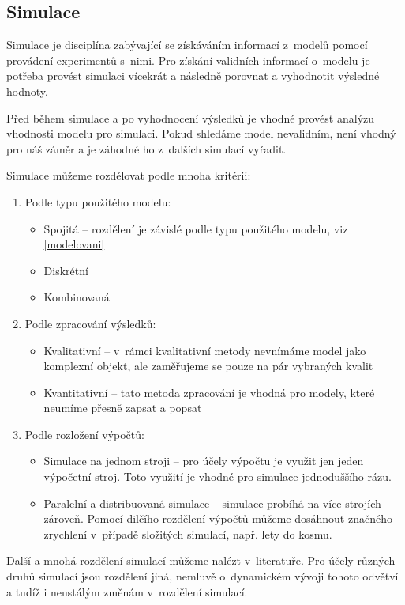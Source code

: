 \subsection{Simulace}
Simulace je disciplína zabývající se získáváním informací z~modelů pomocí provádení experimentů s~nimi. Pro získání validních informací o~modelu je potřeba provést simulaci vícekrát a následně porovnat a vyhodnotit výsledné hodnoty.

Před během simulace a po vyhodnocení výsledků je vhodné provést analýzu vhodnosti modelu pro simulaci. Pokud shledáme model nevalidním, není vhodný pro náš záměr a je záhodné ho z~dalších simulací vyřadit.


Simulace můžeme rozdělovat podle mnoha kritérii:
\begin{enumerate}
    \item Podle typu použitého modelu:
        \begin{itemize}
            \item Spojitá -- rozdělení je závislé podle typu použitého modelu, viz \ref{modelovani}
            \item Diskrétní
            \item Kombinovaná
        \end{itemize}
    \item Podle zpracování výsledků:
        \begin{itemize}
            \item Kvalitativní -- v~rámci kvalitativní metody nevnímáme model jako komplexní objekt, ale zaměřujeme se pouze na pár vybraných kvalit
            \item Kvantitativní -- tato metoda zpracování je vhodná pro modely, které neumíme přesně zapsat a popsat
        \end{itemize}
    \item Podle rozložení výpočtů:
        \begin{itemize}
            \item Simulace na jednom stroji -- pro účely výpočtu je využit jen jeden výpočetní stroj. Toto využití je vhodné pro simulace jednoduššího rázu.
            \item Paralelní a distribuovaná simulace -- simulace probíhá na více strojích zároveň. Pomocí dilčího rozdělení výpočtů můžeme dosáhnout značného zrychlení v~případě složitých simulací, např. lety do kosmu.
        \end{itemize}
\end{enumerate}
Další a mnohá rozdělení simulací můžeme nalézt v~literatuře. Pro účely různých druhů simulací jsou rozdělení jiná, nemluvě o~dynamickém vývoji tohoto odvětví a tudíž i neustálým změnám v~rozdělení simulací.

